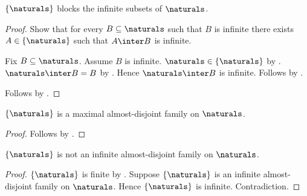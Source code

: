 \begin{proposition}\label{singleton_naturals_blocks_infinite_subsets}
    $\{\naturals\}$ blocks the infinite subsets of $\naturals$.
\end{proposition}
\begin{proof}
    Show that for every $B\subseteq\naturals$ such that $B$ is infinite
        there exists $A\in\{\naturals\}$ such that
            $A\inter B$ is infinite.
    \begin{subproof}
        Fix $B\subseteq\naturals$.
        Assume $B$ is infinite.
        $\naturals\in\{\naturals\}$ by .
        $\naturals\inter B=B$ by
            .
        Hence $\naturals\inter B$ is infinite.
        Follows by \auto.
    \end{subproof}
    Follows by .
\end{proof}

\begin{proposition}\label{singleton_naturals_is_maximal_almost_disjoint_family}
    $\{\naturals\}$ is a maximal almost-disjoint family on
        $\naturals$.
\end{proposition}
\begin{proof}
    Follows by
        .
\end{proof}

\begin{proposition}\label{singleton_naturals_is_not_infinite_almost_disjoint_family}
    $\{\naturals\}$ is not an infinite almost-disjoint family on $\naturals$.
\end{proposition}
\begin{proof}
    $\{\naturals\}$ is finite by .
    Suppose $\{\naturals\}$ is an infinite almost-disjoint family on $\naturals$.
    Hence $\{\naturals\}$ is infinite.
    Contradiction.
\end{proof}

